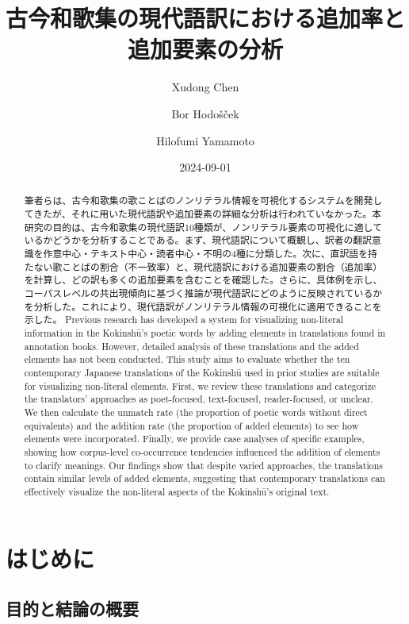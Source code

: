 \documentclass[
  letterpaper,
  DIV=11,
  numbers=noendperiod]{scrartcl}
\title{古今和歌集の現代語訳における追加率と追加要素の分析}
\author{Xudong Chen \and Bor Hodošček \and Hilofumi Yamamoto}
\date{2024-09-01}
\renewcommand*\contentsname{Table of contents}
\newcommand\contentsname{Table of contents}
\begin{document}
\maketitle
\begin{abstract}
筆者らは、古今和歌集の歌ことばのノンリテラル情報を可視化するシステムを開発してきたが、それに用いた現代語訳や追加要素の詳細な分析は行われていなかった。本研究の目的は、古今和歌集の現代語訳10種類が、ノンリテラル要素の可視化に適しているかどうかを分析することである。まず、現代語訳について概観し、訳者の翻訳意識を作意中心・テキスト中心・読者中心・不明の4種に分類した。次に、直訳語を持たない歌ことばの割合（不一致率）と、現代語訳における追加要素の割合（追加率）を計算し、どの訳も多くの追加要素を含むことを確認した。さらに、具体例を示し、コーパスレベルの共出現傾向に基づく推論が現代語訳にどのように反映されているかを分析した。これにより、現代語訳がノンリテラル情報の可視化に適用できることを示した。
Previous research has developed a system for visualizing non-literal
information in the Kokinshū's poetic words by adding elements in
translations found in annotation books. However, detailed analysis of
these translations and the added elements has not been conducted. This
study aims to evaluate whether the ten contemporary Japanese
translations of the Kokinshū used in prior studies are suitable for
visualizing non-literal elements. First, we review these translations
and categorize the translators' approaches as poet-focused,
text-focused, reader-focused, or unclear. We then calculate the unmatch
rate (the proportion of poetic words without direct equivalents) and the
addition rate (the proportion of added elements) to see how elements
were incorporated. Finally, we provide case analyses of specific
examples, showing how corpus-level co-occurrence tendencies influenced
the addition of elements to clarify meanings. Our findings show that
despite varied approaches, the translations contain similar levels of
added elements, suggesting that contemporary translations can
effectively visualize the non-literal aspects of the Kokinshū's original
text.
\end{abstract}

\renewcommand*\contentsname{目次}
{
\hypersetup{linkcolor=}
\setcounter{tocdepth}{3}
\tableofcontents
}
\section{はじめに}\label{ux306fux3058ux3081ux306b}

\subsection{目的と結論の概要}\label{ux76eeux7684ux3068ux7d50ux8ad6ux306eux6982ux8981}
\end{document}
